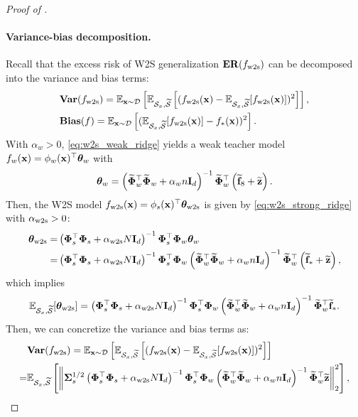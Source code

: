 \begin{proof}[Proof of ]
    \paragraph{Variance-bias decomposition.}
    Recall that the excess risk of W2S generalization $\mathbf{ER}(f_{\mathrm{w2s}})$ can be decomposed into the variance and bias terms:
    \begin{align*}
        &\mathbf{Var}(f_{\mathrm{w2s}}) = \mathbb{E}_{\mathbf{x} \sim \mathcal{D}}\left[\mathbb{E}_{{\mathcal{S}}_x, \widetilde{{\mathcal{S}}}}\left[(f_{\mathrm{w2s}}(\mathbf{x}) - \mathbb{E}_{{\mathcal{S}}_x, \widetilde{{\mathcal{S}}}}[f_{\mathrm{w2s}}(\mathbf{x})])^2\right]\right], \\
        &\mathbf{Bias}(f) = \mathbb{E}_{\mathbf{x} \sim \mathcal{D}}\left[(\mathbb{E}_{{\mathcal{S}}_x, \widetilde{{\mathcal{S}}}}[f_{\mathrm{w2s}}(\mathbf{x})] - f_*(\mathbf{x}))^2\right].
    \end{align*}
    With $\alpha_w > 0$, \eqref{eq:w2s_weak_ridge} yields a weak teacher model $f_w(\mathbf{x}) = \phi_w(\mathbf{x})^\top \boldsymbol{\theta}_w$ with 
    \begin{align*}
        \boldsymbol{\theta}_w = \left(\widetilde{\boldsymbol{\Phi}}_w^\top \widetilde{\boldsymbol{\Phi}}_w + \alpha_w n \mathbf{I}_d\right)^{-1} \widetilde{\boldsymbol{\Phi}}_w^\top \left(\widetilde{\mathbf{f}}_8 + \widetilde{\mathbf{z}}\right).
    \end{align*}
    Then, the W2S model $f_{\mathrm{w2s}}(\mathbf{x}) = \phi_s(\mathbf{x})^\top \boldsymbol{\theta}_{\mathrm{w2s}}$ is given by \eqref{eq:w2s_strong_ridge} with $\alpha_{\mathrm{w2s}} > 0$:
    \begin{align*}
        \boldsymbol{\theta}_{\mathrm{w2s}} = &\left(\boldsymbol{\Phi}_s^\top \boldsymbol{\Phi}_s + \alpha_{\mathrm{w2s}} N \mathbf{I}_d\right)^{-1} \boldsymbol{\Phi}_s^\top \boldsymbol{\Phi}_w \boldsymbol{\theta}_w \\
        = &\left(\boldsymbol{\Phi}_s^\top \boldsymbol{\Phi}_s + \alpha_{\mathrm{w2s}} N \mathbf{I}_d\right)^{-1} \boldsymbol{\Phi}_s^\top \boldsymbol{\Phi}_w \left(\widetilde{\boldsymbol{\Phi}}_w^\top \widetilde{\boldsymbol{\Phi}}_w + \alpha_w n \mathbf{I}_d\right)^{-1} \widetilde{\boldsymbol{\Phi}}_w^\top \left(\widetilde{\mathbf{f}}_* + \widetilde{\mathbf{z}}\right),
    \end{align*}
    which implies
    \begin{align*}
        \mathbb{E}_{{\mathcal{S}}_x, \widetilde{{\mathcal{S}}}}[\boldsymbol{\theta}_{\mathrm{w2s}}] = \left(\boldsymbol{\Phi}_s^\top \boldsymbol{\Phi}_s + \alpha_{\mathrm{w2s}} N \mathbf{I}_d\right)^{-1} \boldsymbol{\Phi}_s^\top \boldsymbol{\Phi}_w \left(\widetilde{\boldsymbol{\Phi}}_w^\top \widetilde{\boldsymbol{\Phi}}_w + \alpha_w n \mathbf{I}_d\right)^{-1} \widetilde{\boldsymbol{\Phi}}_w^\top \widetilde{\mathbf{f}}_*.
    \end{align*}
    Then, we can concretize the variance and bias terms as:
    \begin{align}\label{eq:pf_ridge_var}
    \begin{split}
        &\vari(f_\wts) = \E_{\xb \sim \Dcal}\sbr{\E_{\Scal_x, \wt\Scal}\sbr{(f_\wts(\xb) - \E_{\Scal_x, \wt\Scal}[f_\wts(\xb)])^2}} \\
        = &\E_{\Scal_x, \wt\Scal}\sbr{\nbr{\Sigmab_s^{1/2} \rbr{\Phib_s^\top \Phib_s + \alpha_\wts N \Ib_d}^{-1} \Phib_s^\top \Phib_w \rbr{\wt\Phib_w^\top \wt\Phib_w + \alpha_w n \Ib_d}^{-1} \wt\Phib_w^\top \wt\zb}_2^2},
    \end{split}

\end{align}
\end{proof}
